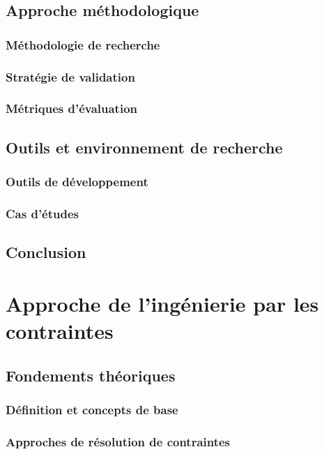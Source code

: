 \documentclass[a4paper,12pt]{article}
\begin{document}
\subsection{Approche méthodologique}
\label{sec:orgaecb0f6}
\subsubsection{Méthodologie de recherche}
\label{sec:org5590d33}
\subsubsection{Stratégie de validation}
\label{sec:org92b5e03}
\subsubsection{Métriques d'évaluation}
\label{sec:org1850808}
\subsection{Outils et environnement de recherche}
\label{sec:org91296c3}
\subsubsection{Outils de développement}
\label{sec:orgc54e4d8}
\subsubsection{Cas d'études}
\label{sec:orgcf70716}
\subsection{Conclusion}
\label{sec:org4b72735}
\clearpage
\section{Approche de l'ingénierie par les contraintes}
\label{sec:org5b7b2a3}
\subsection{Fondements théoriques}
\label{sec:orgc4e0480}
\subsubsection{Définition et concepts de base}
\label{sec:orgb6d6be0}
\subsubsection{Approches de résolution de contraintes}
\label{sec:org7a68e33}
\end{document}
